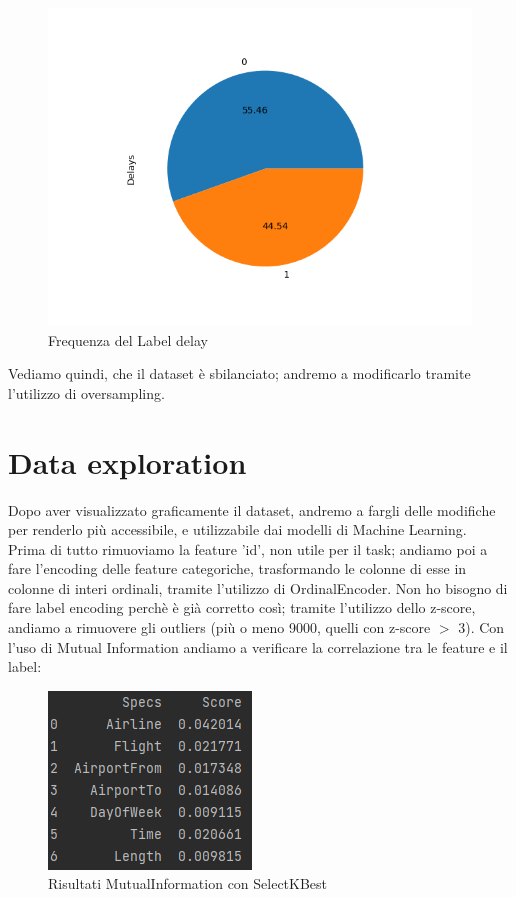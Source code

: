 \documentclass{article}
\begin{document}
\begin{figure}[H]
\centering
\includegraphics{PieChartDelay}
\caption{Frequenza del Label delay}
 \label{fig:image2}
\end{figure}

Vediamo quindi, che il dataset è sbilanciato; andremo a modificarlo tramite l'utilizzo di oversampling.

\section{Data exploration}
Dopo aver visualizzato graficamente il dataset, andremo a fargli delle modifiche per renderlo più accessibile, e utilizzabile dai modelli di Machine Learning.\\
Prima di tutto rimuoviamo la feature 'id', non utile per il task; andiamo poi a fare l'encoding delle feature categoriche, trasformando le colonne di esse in colonne di interi ordinali, tramite l'utilizzo di OrdinalEncoder. Non ho bisogno di fare label encoding perchè è già corretto così; tramite l'utilizzo dello z-score, andiamo a rimuovere gli outliers (più o meno 9000, quelli con z-score $ > $ 3). Con l'uso di Mutual Information andiamo a verificare la correlazione tra le feature e il label: 

\begin{figure}[H]
\centering
\includegraphics{MutualInformation}
\caption{Risultati MutualInformation con SelectKBest}
 \label{fig:image3}
\end{figure}
\end{document}
